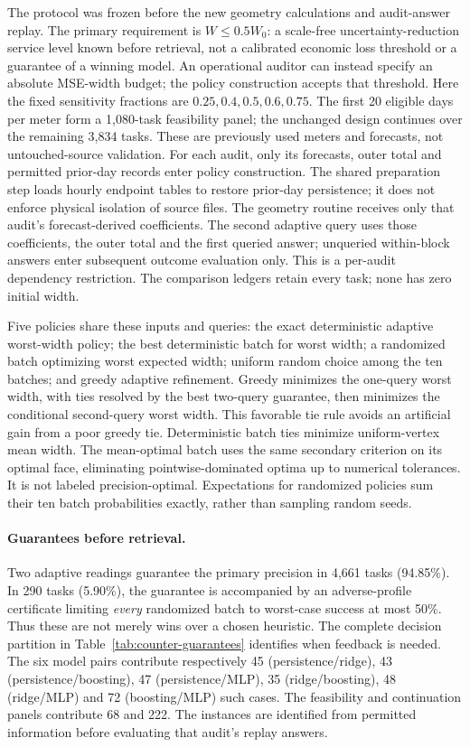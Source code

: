 The protocol was frozen before the new geometry calculations and
audit-answer replay. The primary requirement is $W\leq0.5W_0$: a
scale-free uncertainty-reduction service level known before retrieval,
not a calibrated economic loss threshold or a guarantee of a winning
model. An operational auditor can instead specify an absolute MSE-width
budget; the policy construction accepts that threshold. Here
the fixed sensitivity fractions are $0.25,0.4,0.5,0.6,0.75$.
The first 20 eligible days per meter form a 1,080-task feasibility panel;
the unchanged design continues over the remaining 3,834 tasks. These are
previously used meters and forecasts, not untouched-source validation.
For each audit, only its forecasts, outer total and permitted prior-day
records enter policy construction. The shared preparation step loads
hourly endpoint tables to restore prior-day persistence; it does not
enforce physical isolation of source files. The geometry routine receives
only that audit's forecast-derived coefficients. The second adaptive query
uses those coefficients, the outer total and the first queried answer;
unqueried within-block answers enter subsequent outcome evaluation only.
This is a per-audit dependency restriction. The comparison ledgers
retain every task; none has zero initial width.

Five policies share these inputs and queries: the exact deterministic
adaptive worst-width policy; the best deterministic batch for worst width;
a randomized batch optimizing worst expected width; uniform random choice
among the ten batches; and greedy adaptive refinement. Greedy minimizes
the one-query worst width, with ties resolved by the best two-query
guarantee, then minimizes the conditional second-query worst width.
This favorable tie rule avoids an artificial gain from a poor greedy tie.
Deterministic batch ties minimize uniform-vertex mean width. The mean-optimal
batch uses the same secondary criterion on its optimal face, eliminating
pointwise-dominated optima up to numerical tolerances. It is not labeled precision-optimal.
Expectations for randomized policies sum their ten batch probabilities
exactly, rather than sampling random seeds.

\paragraph{Guarantees before retrieval.}
Two adaptive readings guarantee the primary precision in 4,661 tasks
(94.85\%). In 290 tasks (5.90\%), the guarantee is accompanied by an
adverse-profile certificate limiting \emph{every} randomized batch to
worst-case success at most 50\%. Thus these are not merely wins over a
chosen heuristic. The complete decision partition in
Table~\ref{tab:counter-guarantees} identifies when feedback is needed.
The six model pairs contribute respectively 45 (persistence/ridge),
43 (persistence/boosting), 47 (persistence/MLP), 35 (ridge/boosting),
48 (ridge/MLP) and 72 (boosting/MLP) such cases. The feasibility and
continuation panels contribute 68 and 222. The instances are identified
from permitted information before evaluating that audit's replay answers.

